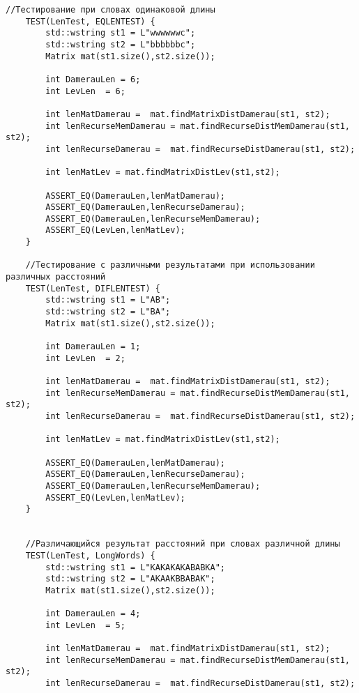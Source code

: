 \begin{lstlisting}[label=lst:unit_tests, caption=Модульные тесты]
    //Тестирование при словах одинаковой длины
    TEST(LenTest, EQLENTEST) {
        std::wstring st1 = L"wwwwwwc";
        std::wstring st2 = L"bbbbbbc";
        Matrix mat(st1.size(),st2.size());
    
        int DamerauLen = 6;
        int LevLen  = 6;
    
        int lenMatDamerau =  mat.findMatrixDistDamerau(st1, st2);
        int lenRecurseMemDamerau = mat.findRecurseDistMemDamerau(st1, st2);
        int lenRecurseDamerau =  mat.findRecurseDistDamerau(st1, st2);
    
        int lenMatLev = mat.findMatrixDistLev(st1,st2);
    
        ASSERT_EQ(DamerauLen,lenMatDamerau);
        ASSERT_EQ(DamerauLen,lenRecurseDamerau);
        ASSERT_EQ(DamerauLen,lenRecurseMemDamerau);
        ASSERT_EQ(LevLen,lenMatLev);
    }
    
    //Тестирование с различными результатами при использовании различных расстояний
    TEST(LenTest, DIFLENTEST) {
        std::wstring st1 = L"AB";
        std::wstring st2 = L"BA";
        Matrix mat(st1.size(),st2.size());
    
        int DamerauLen = 1;
        int LevLen  = 2;
    
        int lenMatDamerau =  mat.findMatrixDistDamerau(st1, st2);
        int lenRecurseMemDamerau = mat.findRecurseDistMemDamerau(st1, st2);
        int lenRecurseDamerau =  mat.findRecurseDistDamerau(st1, st2);
    
        int lenMatLev = mat.findMatrixDistLev(st1,st2);
    
        ASSERT_EQ(DamerauLen,lenMatDamerau);
        ASSERT_EQ(DamerauLen,lenRecurseDamerau);
        ASSERT_EQ(DamerauLen,lenRecurseMemDamerau);
        ASSERT_EQ(LevLen,lenMatLev);
    }
    
    
    //Различающийся результат расстояний при словах различной длины
    TEST(LenTest, LongWords) {
        std::wstring st1 = L"KAKAKAKABABKA";
        std::wstring st2 = L"AKAAKBBABAK";
        Matrix mat(st1.size(),st2.size());
    
        int DamerauLen = 4;
        int LevLen  = 5;
    
        int lenMatDamerau =  mat.findMatrixDistDamerau(st1, st2);
        int lenRecurseMemDamerau = mat.findRecurseDistMemDamerau(st1, st2);
        int lenRecurseDamerau =  mat.findRecurseDistDamerau(st1, st2);
    

\end{lstlisting}
